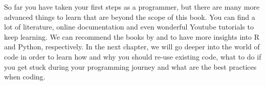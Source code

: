 

So far you have taken your first steps as a programmer, but there are many
more advanced things to learn that are beyond the scope of this
book. You can find a lot of literature, online documentation and even
wonderful Youtube tutorials to keep learning. We can recommend the
books by \cite{crawley2012r} and \cite{vanderplas2016python} to have
more insights into R and Python, respectively. In the next chapter, we
will go deeper into the world of code in order to learn how and why
you should re-use existing code, what to do if you get stuck during your
programming journey and what are the best practices when coding.
